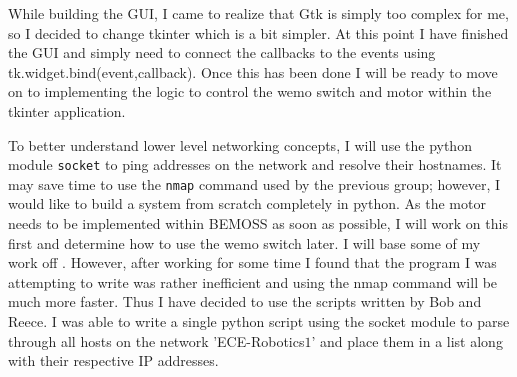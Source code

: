 \documentclass[fontsize=11pt, %
                             paper=letter, %
                             twoside, %
                             captions=tableheading,
                             index=totoc,
                             hyperref]{labbook}
\begin{document}
\begin{addmargin}[0cm]{0cm}
While building the GUI, I came to realize that Gtk is simply too complex for me, so I decided to change tkinter which is a bit simpler. At this point I have finished the GUI and simply need to connect the callbacks to the events using tk.widget.bind(event,callback). Once this has been done I will be ready to move on to implementing the logic to control the wemo switch and motor within the tkinter application.

To better understand lower level networking concepts, I will use the python module \texttt{socket} to ping addresses on the network and resolve their hostnames. It may save time to use the \texttt{nmap} command used by the previous group; however, I would like to build a system from scratch completely in python. As the motor needs to be implemented within BEMOSS as soon as possible, I will work on this first and determine how to use the wemo switch later. I will base some of my work off \cite{scanopy}. However, after working for some time I found that the program I was attempting to write was rather inefficient and using the nmap command will be much more faster. Thus I have decided to use the scripts written by Bob and Reece. I was able to write a single python script using the socket module to parse through all hosts on the network 'ECE-Robotics$1$' and place them in a list along with their respective IP addresses.


\end{addmargin}
\end{document}

